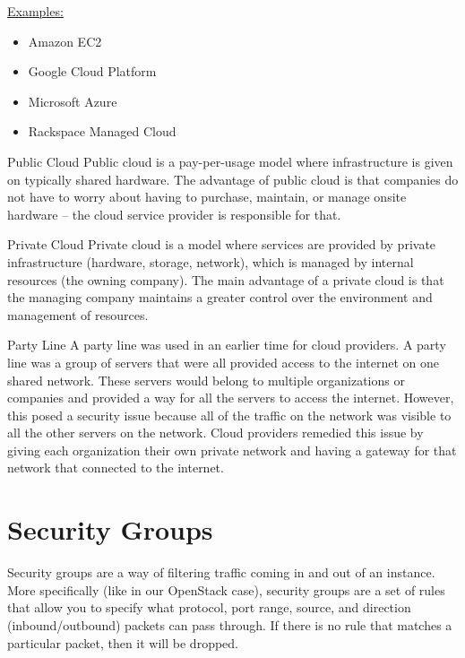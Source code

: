 \documentclass[fancy,11pt,titlestyle=display]{style/elegantbook}
\begin{document}
\underline{Examples:}
\begin{itemize}
    \item Amazon EC2
    \item Google Cloud Platform
    \item Microsoft Azure
    \item Rackspace Managed Cloud
\end{itemize}


\begin{definition}{Public Cloud}{}
Public cloud is a pay-per-usage model where infrastructure is given on typically shared hardware. The advantage of public cloud is that companies do not have to worry about having to purchase, maintain, or manage onsite hardware -- the cloud service provider is responsible for that.
\end{definition}

\begin{definition}{Private Cloud}{}
Private cloud is a model where services are provided by private infrastructure (hardware, storage, network), which is managed by internal resources (the owning company). The main advantage of a private cloud is that the managing company maintains a greater control over the environment and management of resources.
\end{definition}

\begin{definition}{Party Line}{}
A party line was used in an earlier time for cloud providers. A party line was a group of servers that were all provided access to the internet on one shared network. These servers would belong to multiple organizations or companies and provided a way for all the servers to access the internet. However, this posed a security issue because all of the traffic on the network was visible to all the other servers on the network. Cloud providers remedied this issue by giving each organization their own private network and having a gateway for that network that connected to the internet.
\end{definition}

\section{Security Groups}

\par Security groups are a way of filtering traffic coming in and out of an instance. More specifically (like in our OpenStack case), security groups are a set of rules that allow you to specify what protocol, port range, source, and direction (inbound/outbound) packets can pass through. If there is no rule that matches a particular packet, then it will be dropped.
\end{document}
